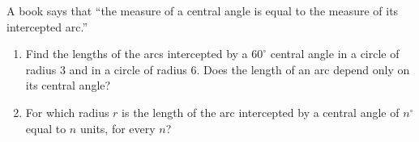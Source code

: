 A book says that ``the measure of a central angle is equal to the measure of its intercepted arc.''
\begin{enumerate}
\item[(a)] Find the lengths of the arcs intercepted by a $60^\circ$ central angle in a circle of radius $3$ and in a circle of radius $6$. Does the length of an arc depend only on its central angle?
\item[(b)] For which radius $r$ is the length of the arc intercepted by a central angle of $n^\circ$ equal to $n$ units, for every $n$?
\end{enumerate}
